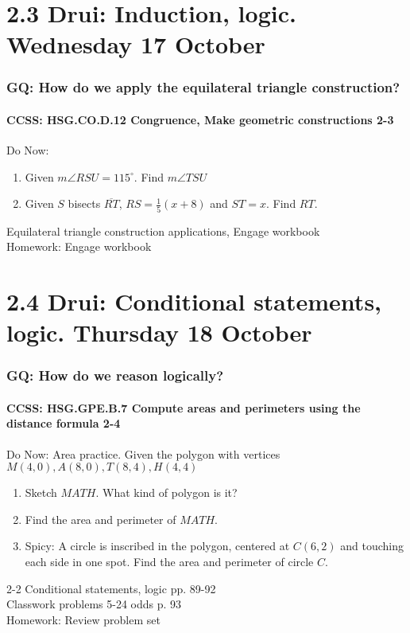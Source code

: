 \documentclass{beamer}
\begin{document}
\section{2.3 Drui: Induction, logic. Wednesday 17 October}
  \frame
  {
    \frametitle{GQ: How do we apply the equilateral triangle construction?}
    \framesubtitle{CCSS: HSG.CO.D.12 Congruence, Make geometric constructions  \alert{2-3}}

    \begin{block}{Do Now:}
    \begin{enumerate}
      \begin{center}
      \end{center}
      \item Given $m\angle RSU = 115^\circ$. Find $m\angle TSU$
      \item Given $S$ bisects $\overline{RT}$, $RS=\frac{1}{5} (x+8)$ and $ST = x$. Find $RT$.
    \end{enumerate}
    \end{block}
    Equilateral triangle construction applications, Engage workbook\\
    \vspace{0.25cm}
    Homework: Engage workbook
  }

\section{2.4 Drui: Conditional statements, logic. Thursday 18 October}
  \frame
  {
    \frametitle{GQ: How do we reason logically?}
    \framesubtitle{CCSS: HSG.GPE.B.7 Compute areas and perimeters using the distance formula  \alert{2-4}}

    \begin{block}{Do Now: Area practice. Given the polygon with vertices $M(4,0), A(8,0), T(8,4), H(4,4)$}
    \begin{enumerate}
        \item Sketch $MATH$. What kind of polygon is it?
        \item Find the area and perimeter of $MATH$.
        \item Spicy: A circle is inscribed in the polygon, centered at $C(6,2)$ and touching each side in one spot. Find the area and perimeter of circle $C$.
    \end{enumerate}
    \end{block}
    2-2 Conditional statements, logic  pp. 89-92\\
    Classwork problems 5-24 odds p. 93\\
    \vspace{0.5cm}
    Homework: Review problem set
  }
\end{document}
